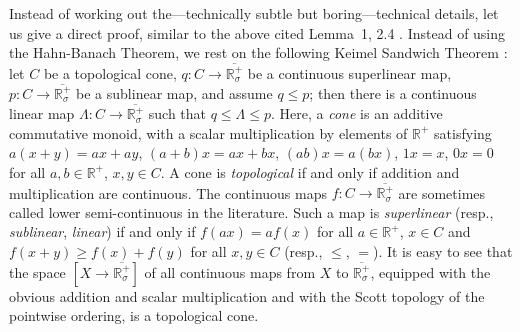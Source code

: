 \documentclass{LMCS}
\newcommand{\real}{\mathbb{R}}
\newcommand{\creal}{\overline{\real^+_\sigma}}
\begin{document}
Instead of working out the---technically subtle but boring---technical
details, let us give a direct proof, similar to the above cited
Lemma~1, 2.4 \cite{Bourbaki:int:IX}.  Instead of using the Hahn-Banach
Theorem, we rest on the following Keimel Sandwich Theorem
\cite[Theorem~8.2]{Keimel:topcones}: let $C$ be a topological cone, $q
: C \to \creal$ be a continuous superlinear map, $p : C \to \creal$ be
a sublinear map, and assume $q \leq p$; then there is a continuous
linear map $\Lambda : C \to \creal$ such that $q \leq \Lambda \leq p$.
Here, a \emph{cone} is an additive commutative monoid, with a scalar
multiplication by elements of $\real^+$ satisfying $a (x+y)=ax+ay$,
$(a+b)x = ax+bx$, $(ab)x=a(bx)$, $1x=x$, $0x=0$ for all $a, b \in
\real^+$, $x, y \in C$.  A cone is \emph{topological} if and only if
addition and multiplication are continuous.  The continuous maps $f :
C \to \creal$ are sometimes called lower semi-continuous in the
literature.  Such a map is \emph{superlinear} (resp.,
\emph{sublinear}, \emph{linear}) if and only if $f (ax)=af (x)$ for
all $a \in \real^+$, $x \in C$ and $f (x+y) \geq f (x)+f (y)$ for all
$x, y \in C$ (resp., $\leq$, $=$).  It is easy to see that the space
$[X \to \creal]$ of all continuous maps from $X$ to $\creal$, equipped
with the obvious addition and scalar multiplication and with the Scott
topology of the pointwise ordering, is a topological cone.
\end{document}
